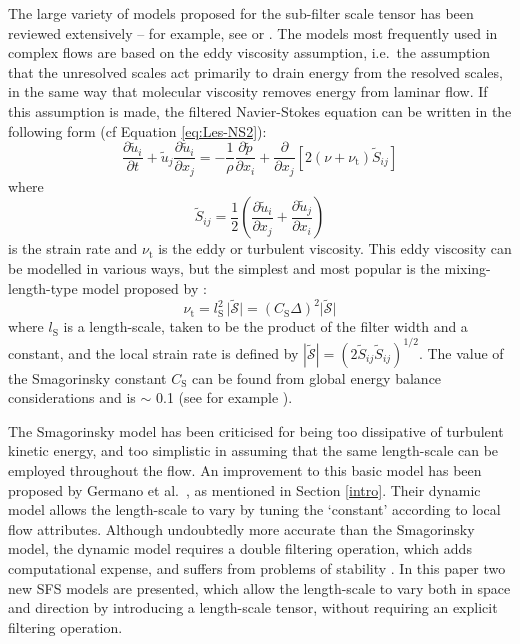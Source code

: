 The large variety of models proposed for the sub-filter scale
tensor has been reviewed extensively -- for example, see
\cite{LnM96} or \cite{MnK00}. The models most frequently used in
complex flows are based on the eddy viscosity assumption, i.e.~the
assumption that the unresolved scales act primarily to drain
energy from the resolved scales, in the same way that molecular
viscosity removes energy from laminar flow. If this assumption is
made, the filtered Navier-Stokes equation can be written in the
following form (cf Equation \ref{eq:Les-NS2}):
\begin{equation}
\frac{\partial \tilde{u}_i}{\partial t}+ \tilde{u}_j
\frac{\partial \tilde{u}_i}{\partial x_j}= -\frac{1}{\rho}
\frac{\partial \tilde{p}}{\partial x_i}+ \frac{\partial}{\partial
x_j} \left[2\left(\nu+\nu_{\textrm{t}}\right)
\tilde{S}_{ij}\right]
\end{equation}
where
\begin{equation}
\tilde{S}_{ij}=\frac{1}{2} \left(\frac{\partial
\tilde{u}_i}{\partial x_j}+ \frac{\partial \tilde{u}_j}{\partial
x_i}\right)
\end{equation}
is the strain rate and $\nu_{\textrm{t}}$ is the eddy or turbulent
viscosity. This eddy viscosity can be modelled in various ways,
but the simplest and most popular is the mixing-length-type model
proposed by \cite{Sma63}:
\begin{equation}
\nu_{\textrm{t}}=l_{\textrm{S}}^2\,\vert\tilde{\mathcal{S}}\vert=
\left(C_{\textrm{S}}\Delta\right)^2\vert\tilde{\mathcal{S}}\vert
\label{eq:Smag}
\end{equation}
where $l_{\textrm{S}}$ is a length-scale, taken to be the product
of the filter width and a constant, and the local strain rate is
defined by $ |\tilde{\mathcal{S}}|=
(2\tilde{S}_{ij}\tilde{S}_{ij})^{1/2} $. The value of the
Smagorinsky constant $C_{\textrm{S}}$ can be found from global
energy balance considerations and is $\sim$ 0.1 (see for example
\cite{LnM96}).

The Smagorinsky model has been criticised for being too
dissipative of turbulent kinetic energy, and too simplistic in
assuming that the same length-scale can be employed throughout the
flow. An improvement to this basic model has been proposed by
Germano et al.~\cite{GPM91}, as mentioned in Section \ref{intro}.
Their dynamic model allows the length-scale to vary by tuning the
`constant' according to local flow attributes. Although
undoubtedly more accurate than the Smagorinsky model, the dynamic
model requires a double filtering operation, which adds
computational expense, and suffers from problems of stability
\cite{LnM96}. In this paper two new SFS models are presented,
which allow the length-scale to vary both in space and direction
by introducing a length-scale tensor, without requiring an
explicit filtering operation.


